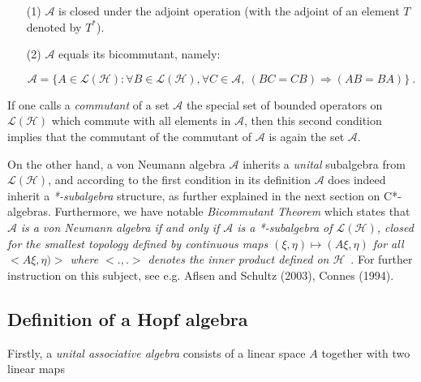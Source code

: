 \documentclass[12pt]{article}
\theoremstyle{plain}
\theoremstyle{definition}
\numberwithin{equation}{section}
\newcommand{\A}{\mathcal A}
\renewcommand{\H}{\mathcal H}
\renewcommand{\cL}{\mathcal L}
\newcommand{\med}{\medbreak}
\begin{document}
\begin{itemize}

\item[(1)] $\A$ is closed under the adjoint operation (with the
adjoint of an element $T$ denoted by $T^*$).

\med
\item[(2)]
$\A$ equals its bicommutant, namely:

\begin{equation}
\A= \{A \in \cL(\H) : \forall B \in \cL(\H), \forall C\in \A,~
(BC=CB)\Rightarrow (AB=BA)\}~.
\end{equation}
\end{itemize}

If one calls a \emph{commutant} of a set $\A$ the special set of
bounded operators on $\cL(\H)$ which commute with all elements in
$\A$, then this second condition implies that the commutant of the
commutant of $\A$ is again the set $\A$.

\med
On the other hand, a von Neumann algebra $\A$ inherits a
\emph{unital} subalgebra from $\cL(\H)$, and according to the
first condition in its definition $\A$ does indeed inherit a
\emph{*-subalgebra} structure, as further explained in the next
section on C*-algebras. Furthermore, we have notable
\emph{Bicommutant Theorem} which states that $\A$ \emph{is a von
Neumann algebra if and only if $\A$ is a *-subalgebra of
$\cL(\H)$, closed for the smallest topology defined by continuous
maps $(\xi,\eta)\longmapsto (A\xi,\eta)$ for all $<A\xi,\eta)>$
where $<.,.>$ denotes the inner product defined on $\H$}~. For
further instruction on this subject, see e.g. Aflsen and Schultz
(2003), Connes (1994).


\subsection{Definition of a Hopf algebra}
\med
Firstly, a {\em unital associative algebra} consists of a linear space
$A$ together with two linear maps
\end{document}
